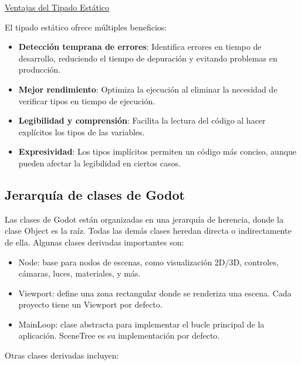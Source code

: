 \documentclass[12pt]{book} %
\providecommand{\tightlist}{%
  \setlength{\itemsep}{0pt}\setlength{\parskip}{0pt}}
\begin{document}
\underline{Ventajas del Tipado Estático}

El tipado estático ofrece múltiples beneficios:

\begin{itemize}
\tightlist
\item
  \textbf{Detección temprana de errores}: Identifica errores en tiempo
  de desarrollo, reduciendo el tiempo de depuración y evitando problemas
  en producción.
\item
  \textbf{Mejor rendimiento}: Optimiza la ejecución al eliminar la
  necesidad de verificar tipos en tiempo de ejecución.
\item
  \textbf{Legibilidad y comprensión}: Facilita la lectura del código al
  hacer explícitos los tipos de las variables.
\item
  \textbf{Expresividad}: Los tipos implícitos permiten un código más
  conciso, aunque pueden afectar la legibilidad en ciertos casos.
\end{itemize}

\hypertarget{jerarquuxeda-de-clases-de-godot}{%
\subsection{Jerarquía de clases de
Godot}\label{jerarquuxeda-de-clases-de-godot}}

Las clases de Godot están organizadas en una jerarquía de herencia,
donde la clase Object es la raíz. Todas las demás clases heredan directa
o indirectamente de ella. Algunas clases derivadas importantes son:

\begin{itemize}
\tightlist
\item
  Node: base para nodos de escenas, como visualización 2D/3D, controles,
  cámaras, luces, materiales, y más.
\item
  Viewport: define una zona rectangular donde se renderiza una escena.
  Cada proyecto tiene un Viewport por defecto.
\item
  MainLoop: clase abstracta para implementar el bucle principal de la
  aplicación. SceneTree es su implementación por defecto.
\end{itemize}

Otras clases derivadas incluyen:
\end{document}

